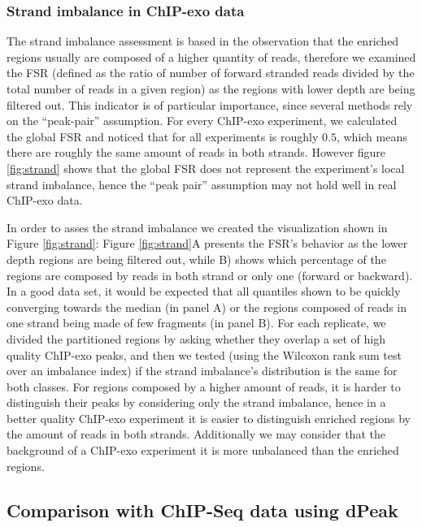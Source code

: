 \documentclass{bmcart}\usepackage[]{graphicx}\usepackage[]{color}
\begin{document}
\subsubsection{Strand imbalance in ChIP-exo data}

The strand imbalance assessment is based in the observation that the
enriched regions usually are composed of a higher quantity of reads,
therefore we examined the FSR (defined as the ratio of number of
forward stranded reads divided by the total number of reads in a given
region) as the regions with lower depth are being filtered out. This
indicator is of particular importance, since several methods rely on
the ``peak-pair'' assumption. For every ChIP-exo experiment, we
calculated the global FSR and noticed that for all experiments is
roughly $0.5$, which means there are roughly the same amount of reads
in both strands. However figure \ref{fig:strand} shows that the global
FSR does not represent the experiment's local strand imbalance, hence
the ``peak pair'' assumption may not hold well in real ChIP-exo data.

In order to asses the strand imbalance we created the visualization
shown in Figure \ref{fig:strand}: Figure \ref{fig:strand}A presents
the FSR's behavior as the lower depth regions are being filtered out,
while B) shows which percentage of the regions are composed by reads
in both strand or only one (forward or backward). In a good data set,
it would be expected that all quantiles shown to be quickly converging
towards the median (in panel A) or the regions composed of reads in
one strand being made of few fragments (in panel B). For each
replicate, we divided the partitioned regions by asking whether they
overlap a set of high quality ChIP-exo peaks, and then we tested
(using the Wilcoxon rank sum test over an imbalance index) if the
strand imbalance's distribution is the same for both classes. For
regions composed by a higher amount of reads, it is harder to
distinguish their peaks by considering only the strand imbalance,
hence in a better quality ChIP-exo experiment it is easier to
distinguish enriched regions by the amount of reads in both
strands. Additionally we may consider that the background of a
ChIP-exo experiment it is more unbalanced than the enriched regions.

\subsection{Comparison with ChIP-Seq data using dPeak}
\end{document}

